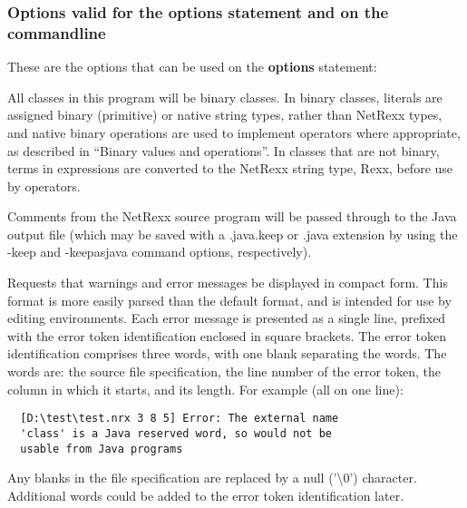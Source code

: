 \subsubsection{Options valid for the options statement and on the commandline}
These are the options that can be used on the \textbf{options} statement:
\begin{description}
\item[-binary]
All classes in this program will be binary classes. In binary classes, literals are assigned binary (primitive) or native string types, rather than NetRexx types, and native binary operations are used to implement operators where appropriate, as described in “Binary values and operations”. In classes that are not binary, terms in expressions are converted to the NetRexx string type, Rexx, before use by operators.

\item[-comments]
Comments from the NetRexx source program will be passed through to the Java output file (which may be saved with a .java.keep or .java extension by using the -keep and -keepasjava command options, respectively).

\item[-compact]
Requests that warnings and error messages be displayed in compact form. This format is more easily parsed than the default format, and is intended for use by editing environments.
Each error message is presented as a single line, prefixed with the error token identification enclosed in square brackets. The error token identification comprises three words, with one blank separating the words. The words are: the source file specification, the line number of the error token, the column in which it starts, and its length. For example (all on one line):
\begin{verbatim}
  [D:\test\test.nrx 3 8 5] Error: The external name
  'class' is a Java reserved word, so would not be
  usable from Java programs
\end{verbatim}
Any blanks in the file specification are replaced by a null ('\textbackslash 0') character. Additional words could be added to the error token identification later.


\end{description}
